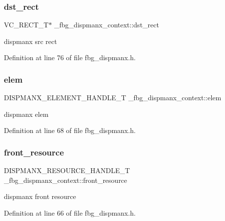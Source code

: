 \subsubsection{\texorpdfstring{dst\+\_\+rect}{dst\_rect}}
{\footnotesize\ttfamily V\+C\+\_\+\+R\+E\+C\+T\+\_\+T$\ast$ \+\_\+fbg\+\_\+dispmanx\+\_\+context\+::dst\+\_\+rect}



dispmanx src rect 



Definition at line 76 of file fbg\+\_\+dispmanx.\+h.

\mbox{\label{struct__fbg__dispmanx__context_ab18b7173ed0ff6e670068041cf0779e9}} 
\subsubsection{\texorpdfstring{elem}{elem}}
{\footnotesize\ttfamily D\+I\+S\+P\+M\+A\+N\+X\+\_\+\+E\+L\+E\+M\+E\+N\+T\+\_\+\+H\+A\+N\+D\+L\+E\+\_\+T \+\_\+fbg\+\_\+dispmanx\+\_\+context\+::elem}



dispmanx elem 



Definition at line 68 of file fbg\+\_\+dispmanx.\+h.

\mbox{\label{struct__fbg__dispmanx__context_acfd61d15e712eb715bb99ff4c6ec1dc7}} 
\subsubsection{\texorpdfstring{front\+\_\+resource}{front\_resource}}
{\footnotesize\ttfamily D\+I\+S\+P\+M\+A\+N\+X\+\_\+\+R\+E\+S\+O\+U\+R\+C\+E\+\_\+\+H\+A\+N\+D\+L\+E\+\_\+T \+\_\+fbg\+\_\+dispmanx\+\_\+context\+::front\+\_\+resource}



dispmanx front resource 



Definition at line 66 of file fbg\+\_\+dispmanx.\+h.

